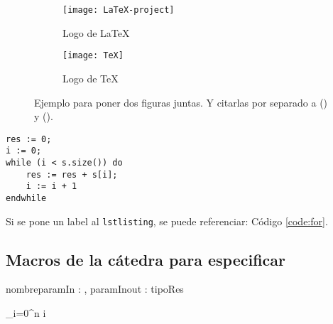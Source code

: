 \documentclass[10pt,a4paper]{article}
\begin{document}
\begin{figure}[ht!]
	\begin{subfigure}{0.5\textwidth}
		\texttt{[image: LaTeX-project]} 
		\caption{Logo de LaTeX}
		\label{fig:subfig1}
	\end{subfigure}
	\begin{subfigure}{0.5\textwidth}
		\texttt{[image: TeX]}
		\caption{Logo de TeX}
		\label{fig:subfig2}
	\end{subfigure}
	\caption{Ejemplo para poner dos figuras juntas. Y citarlas por separado a () y ().}
	\label{fig:subfigs}
\end{figure}



	\begin{lstlisting}[caption={Ejemplo de código (usando los estilos de la cátedra, ver las macros para más detalles)},label=code:for]
res := 0;
i := 0;
while (i < s.size()) do
	res := res + s[i];
	i := i + 1
endwhile
	\end{lstlisting}

Si se pone un label al \verb|lstlisting|, se puede referenciar: Código \ref{code:for}.


\subsection{Macros de la cátedra para especificar}

\begin{proc}{nombre}{\In paramIn : \nat, \Inout paramInout : \TLista{\ent}}{tipoRes}
\end{proc}

 {\sum\limits_{i=0}^{n} i}

\end{document}
